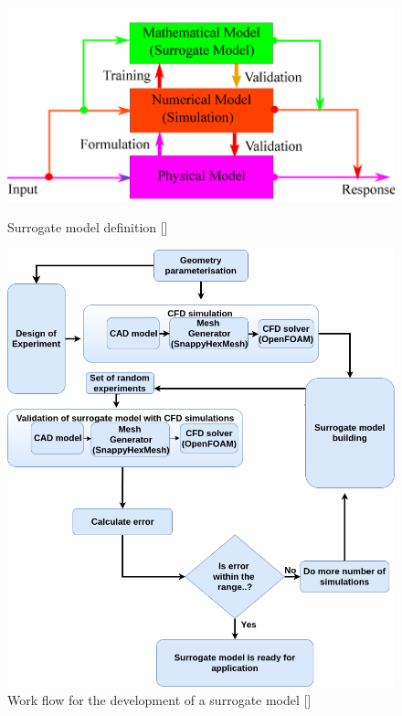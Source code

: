 \begin{figure}[H]
	\includegraphics[width=\textwidth]{optimization/surrogate.png}
	\label{Surrogate model} %
	\caption{Surrogate model definition []}
\end{figure}


\begin{figure}[htbp]
	\includegraphics[width=\textwidth]{optimization/flow_chart.png}
  
	\caption{Work flow for the development of a surrogate model []}
	\label{fig:work flow for the development of a surrogate model} %
\end{figure}


